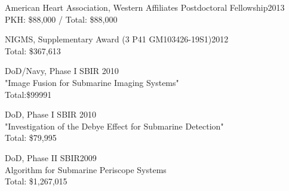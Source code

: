 American Heart Association, Western Affiliates Postdoctoral Fellowship\dapi \hfill 2013 \\
PKH: \$88,000 / Total: \$88,000 

NIGMS,  Supplementary Award  (3 P41 GM103426-19S1)\dasig  \hfill 2012 \\
Total: \$367,613 

\noindent DoD/Navy, Phase I SBIR \dasig \hfill 2010 \\
"Image Fusion for Submarine Imaging Systems"\\
Total:\$99991 


DoD, Phase I SBIR \dasig  \hfill 2010 \\
"Investigation of the Debye Effect for Submarine Detection" \\
Total: \$79,995

DoD, Phase II SBIR\dasig \hfill 2009 \\
Algorithm for Submarine Periscope Systems \\
Total: \$1,267,015

